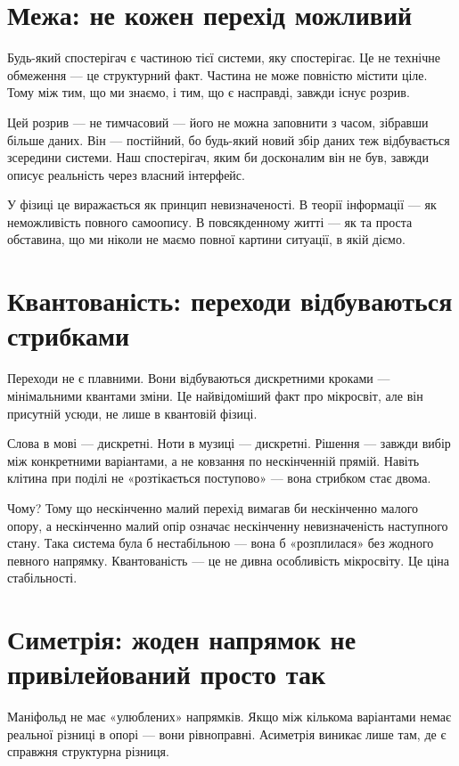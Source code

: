 \documentclass[12pt, a4paper, openany]{book}
\begin{document}
\section{Межа: не кожен перехід можливий}

Будь-який спостерігач є частиною тієї системи, яку спостерігає. Це не технічне обмеження --- це структурний факт. Частина не може повністю містити ціле. Тому між тим, що ми знаємо, і тим, що є насправді, завжди існує розрив.

Цей розрив — не тимчасовий --- його не можна заповнити з часом, зібравши більше даних. Він — постійний, бо будь-який новий збір даних теж відбувається зсередини системи. Наш спостерігач, яким би досконалим він не був, завжди описує реальність через власний інтерфейс.

У фізиці це виражається як принцип невизначеності. В теорії інформації --- як неможливість повного самоопису. В повсякденному житті --- як та проста обставина, що ми ніколи не маємо повної картини ситуації, в якій діємо.

\section{Квантованість: переходи відбуваються стрибками}

Переходи не є плавними. Вони відбуваються дискретними кроками --- мінімальними квантами зміни. Це найвідоміший факт про мікросвіт, але він присутній усюди, не лише в квантовій фізиці.

Слова в мові --- дискретні. Ноти в музиці --- дискретні. Рішення --- завжди вибір між конкретними варіантами, а не ковзання по нескінченній прямій. Навіть клітина при поділі не «розтікається поступово» --- вона стрибком стає двома.

Чому? Тому що нескінченно малий перехід вимагав би нескінченно малого опору, а нескінченно малий опір означає нескінченну невизначеність наступного стану. Така система була б нестабільною --- вона б «розплилася» без жодного певного напрямку. Квантованість --- це не дивна особливість мікросвіту. Це ціна стабільності.

\section{Симетрія: жоден напрямок не привілейований просто так}

Маніфольд не має «улюблених» напрямків. Якщо між кількома варіантами немає реальної різниці в опорі --- вони рівноправні. Асиметрія виникає лише там, де є справжня структурна різниця.
\end{document}

